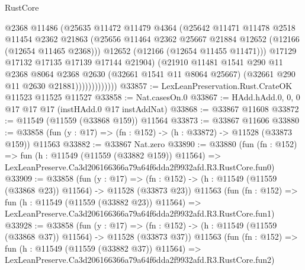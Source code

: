 \begin{lexlean}{RustCore}
\begin{coremodule}
                          @2368
                          @11486
                          (@25635
                            @11472
                            @11479
                            @4364
                            (@25642
                              @11471
                              @11478
                              @2518
                              @11454
                              @2362
                              @21863
                              (@25656
                                @11464
                                @2362
                                @25667
                                @21884
                                @12652
                                (@12166 (@12654 @11465 @2368)))
                              @12652
                              (@12166 (@12654 @11455 @11471)))
                            @17129
                            @17132
                            @17135
                            @17139
                            @17144
                            @21904)
                          (@21910
                            @11481
                            @1541
                            @290
                            @11
                            @2368
                            @8064
                            @2368
                            @2630
                            (@32661 @1541 @11 @8064 @25667)
                            (@32661 @290 @11 @2630 @21881)))))))))))))
@33857 := LexLeanPreservation.Rust.CrateOK @11523 @11525 @11527
@33858 := Nat.casesOn.{0}
@33867 := HAdd.hAdd.{0, 0, 0} @17 @17 @17 (instHAdd.{0} @17 instAddNat)
@33868 := @33867 @11608
@33872 := @11549 (@11559 (@33868 @159)) @11564
@33873 := @33867 @11606
@33880 := @33858 (fun (y : @17) => (fn : @152) -> (h : @33872) -> @11528 (@33873 @159)) @11563
@33882 := @33867 Nat.zero
@33890 := @33880
    (fun (fn : @152) =>
    fun (h : @11549 (@11559 (@33882 @159)) @11564) =>
    LexLeanPreserve.Ca3d206166366a79a64f6dda2f9932afd.R3.RustCore.fun0)
@33909 := @33858
    (fun (y : @17) =>
    (fn : @152) -> (h : @11549 (@11559 (@33868 @23)) @11564) -> @11528 (@33873 @23))
    @11563
    (fun (fn : @152) =>
    fun (h : @11549 (@11559 (@33882 @23)) @11564) =>
    LexLeanPreserve.Ca3d206166366a79a64f6dda2f9932afd.R3.RustCore.fun1)
@33928 := @33858
    (fun (y : @17) =>
    (fn : @152) -> (h : @11549 (@11559 (@33868 @37)) @11564) -> @11528 (@33873 @37))
    @11563
    (fun (fn : @152) =>
    fun (h : @11549 (@11559 (@33882 @37)) @11564) =>
    LexLeanPreserve.Ca3d206166366a79a64f6dda2f9932afd.R3.RustCore.fun2)

\end{coremodule}
\end{lexlean}
